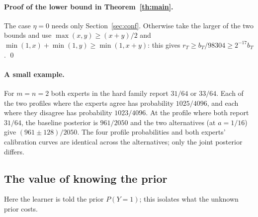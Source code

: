 \documentclass[11pt,a4paper]{article}
\theoremstyle{remark}
\begin{document}
\paragraph{Proof of the lower bound in Theorem~\ref{th:main}.} The case $\eta=0$ needs only Section~\ref{sec:conf}. Otherwise take the larger of the two bounds and use $\max(x,y)\ge(x+y)/2$ and $\min(1,x)+\min(1,y)\ge\min(1,x+y)$: this gives $r_T\ge b_T/98304\ge2^{-17}b_T$. \qed

\paragraph{A small example.} For $m=n=2$ both experts in the hard family report $31/64$ or $33/64$. Each of the two profiles where the experts agree has probability $1025/4096$, and each where they disagree has probability $1023/4096$. At the profile where both report $31/64$, the baseline posterior is $961/2050$ and the two alternatives (at $a=1/16$) give $(961\pm128)/2050$. The four profile probabilities and both experts' calibration curves are identical across the alternatives; only the joint posterior differs.

\subsection{The value of knowing the prior}\label{sec:oracle}
Here the learner is told the prior $P(Y=1)$; this isolates what the unknown prior costs.
\end{document}
